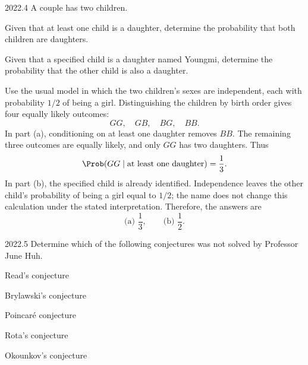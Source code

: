     \begin{pastproblem}{2022.4}
        A couple has two children.
        \begin{problemsubparts}
            \item Given that at least one child is a daughter, determine the probability that
                  both children are daughters.
            \item Given that a specified child is a daughter named Youngmi, determine the
                  probability that the other child is also a daughter.
        \end{problemsubparts}
    \end{pastproblem}

    \begin{solution}
Use the usual model in which the two children's sexes are independent,
        each with probability $1/2$ of being a girl. Distinguishing the children
        by birth order gives four equally likely outcomes:
        \[
            GG,\quad GB,\quad BG,\quad BB.
        \]
        In part (a), conditioning on at least one daughter removes $BB$.
        The remaining three outcomes are equally likely, and only $GG$ has
        two daughters. Thus
        \[
            \Prob(GG\mid\text{at least one daughter})=\frac13.
        \]
        In part (b), the specified child is already identified. Independence
        leaves the other child's probability of being a girl equal to $1/2$;
        the name does not change this calculation under the stated interpretation.
        Therefore, the answers are
        \[
            \boxed{\text{(a) }\frac13,\qquad\text{(b) }\frac12}.
        \]
    \end{solution}

    \begin{pastproblem}{2022.5}
        Determine which of the following conjectures was not solved by Professor June Huh.
        \begin{problemchoices}
            \item Read's conjecture
            \item Brylawski's conjecture
            \item Poincaré conjecture
            \item Rota's conjecture
            \item Okounkov's conjecture
        \end{problemchoices}
    \end{pastproblem}

